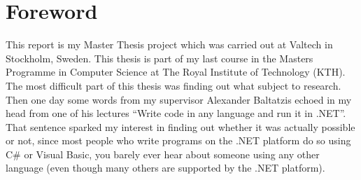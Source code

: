 \chapter*{Foreword}

This report is my Master Thesis project which was carried out at Valtech in Stockholm, Sweden. This thesis is part of my last course in the Masters Programme in Computer Science at The Royal Institute of Technology (KTH). The most difficult part of this thesis was finding out what subject to research. Then one day some words from my supervisor Alexander Baltatzis echoed in my head from one of his lectures ``Write code in any language and run it in .NET''. That sentence sparked my interest in finding out whether it was actually possible or not, since most people who write programs on the .NET platform do so using C\# or Visual Basic, you barely ever hear about someone using any other language (even though many others are supported by the .NET platform). 